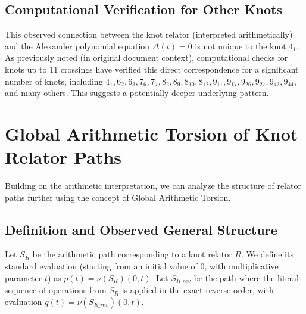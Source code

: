 \documentclass{article}[a4paper,12pt]
\begin{document}
\subsection{Computational Verification for Other Knots}

This observed connection between the knot relator (interpreted arithmetically) and the Alexander polynomial equation $\Delta(t)=0$ is not unique to the knot $4_1$. As previously noted (in original document context), computational checks for knots up to 11 crossings have verified this direct correspondence for a significant number of knots, including $4_1, 6_2, 6_3, 7_6, 7_7, 8_2, 8_9, 8_{10}, 8_{12}, 9_{11}, 9_{17}, 9_{26}, 9_{27}, 9_{42}, 9_{44}$, and many others. This suggests a potentially deeper underlying pattern.


\section{Global Arithmetic Torsion of Knot Relator Paths}
\label{sec:global_torsion}

Building on the arithmetic interpretation, we can analyze the structure of relator paths further using the concept of Global Arithmetic Torsion.

\subsection{Definition and Observed General Structure}

Let $S_R$ be the arithmetic path corresponding to a knot relator $R$. We define its standard evaluation (starting from an initial value of 0, with multiplicative parameter $t$) as $p(t) = \nu(S_R)(0,t)$. Let $S_{R\_rev}$ be the path where the literal sequence of operations from $S_R$ is applied in the exact reverse order, with evaluation $q(t) = \nu(S_{R\_rev})(0,t)$.
\end{document}
